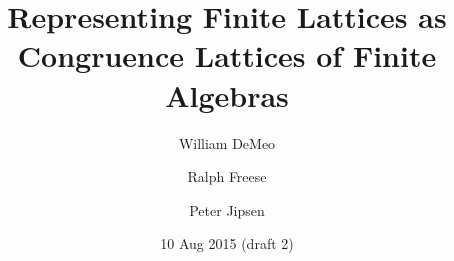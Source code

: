 

\title[Representing Finite Lattices]{Representing Finite Lattices as \\Congruence
  Lattices of Finite Algebras} 


\author[W. DeMeo]{William DeMeo}
\address{Department of Mathematics\\Iowa State University\\Ames 50010\\USA}
\author[R. Freese]{Ralph Freese}
\address{Department of Mathematics\\University of Hawaii\\Honolulu 96822\\USA}
\author[P. Jipsen]{Peter Jipsen}
\address{School of Computational Sciences\\Chapman University\\Orange 92866\\USA}


\date{10 Aug 2015 (draft 2)}







